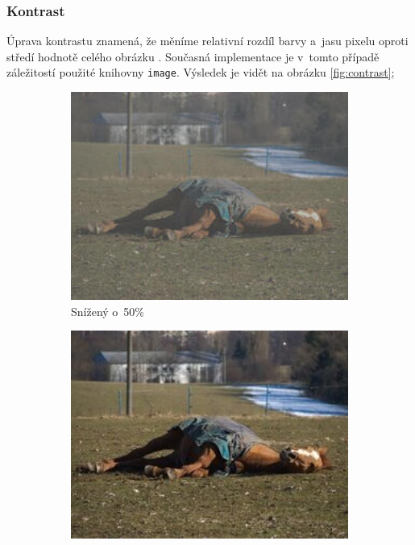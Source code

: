 \documentclass[11pt, a4paper, titlepage]{article}
\begin{document}
\subsubsection{Kontrast}
Úprava kontrastu znamená, že měníme relativní rozdíl barvy a~jasu pixelu oproti středí hodnotě celého obrázku \cite{wiki:Contrast_vision}.
Současná implementace je v~tomto případě záležitostí použité knihovny \texttt{image}.
Výsledek je vidět na obrázku \ref{fig:contrast};
\begin{figure}[h]
    \centering
    \begin{subfigure}[t]{0.25\textwidth}
        \vskip 0pt
        \includegraphics[width=1.0\textwidth]{horse_contrast_minus.jpg}
        \caption{Snížený o~50\%}
    \end{subfigure}
    \hspace{1cm}
    \begin{subfigure}[t]{0.25\textwidth}
        \vskip 0pt
        \includegraphics[width=1.0\textwidth]{horse_original.jpg}

\end{subfigure}
\end{figure}
\end{document}

